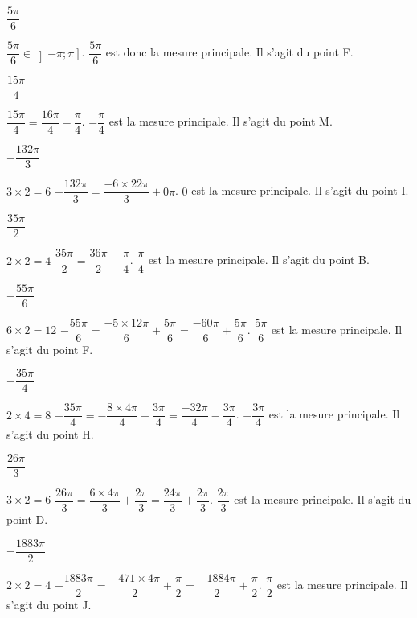 \documentclass[11pt,a4paper]{article}  %
\begin{document}
	\begin{enumMet}
		\item $\dfrac{5\pi}{6}$
		\begin{corrBox}
			$\dfrac{5 \pi}{6} \in\left]-\pi ; \pi\right]$. $\dfrac{5 \pi}{6}$ est donc la mesure principale. Il s'agit du point F.	
		\end{corrBox}
		\item $\dfrac{15\pi}{4}$
		\begin{corrBox}
			$\dfrac{15 \pi}{4}=\dfrac{16 \pi}{4}-\dfrac{\pi}{4}$. $-\dfrac{\pi}{4}$ est la mesure principale. Il s'agit du point M.
		\end{corrBox}
		\item $-\dfrac{132\pi}{3}$
		\begin{corrBox}
			$3 \times 2=6$ \quad \quad $-\dfrac{132\pi}{3}=\dfrac{-6 \times 22 \pi}{3}+0 \pi$. $0$ est la mesure principale. Il s'agit du point I.
		\end{corrBox}
		\item $\dfrac{35\pi}{2}$
		\begin{corrBox}
			$2 \times 2=4$ \quad \quad $\dfrac{35 \pi}{2}=\dfrac{36 \pi}{2}-\dfrac{\pi}{4}$. $\dfrac{\pi}{4}$ est la mesure principale. Il s'agit du point B.
		\end{corrBox}
		\item $-\dfrac{55\pi}{6}$
		\begin{corrBox}
			$6 \times 2=12$ \quad \quad $-\dfrac{55 \pi}{6}=\dfrac{-5 \times 12 \pi}{6}+\dfrac{5 \pi}{6}=\dfrac{-60 \pi}{6}+\dfrac{5 \pi}{6}$. $\dfrac{5 \pi}{6}$ est la mesure principale. Il s'agit du point F.
		\end{corrBox}
		\item $-\dfrac{35\pi}{4}$
		\begin{corrBox}
			$2 \times 4=8$ \quad \quad $-\dfrac{35 \pi}{4}=-\dfrac{8 \times 4 \pi}{4}-\dfrac{3 \pi}{4}=\dfrac{-32 \pi}{4}-\dfrac{3 \pi}{4}$. $-\dfrac{3 \pi}{4}$ est la mesure principale. Il s'agit du point H.
		\end{corrBox}
		\item $\dfrac{26\pi}{3}$
		\begin{corrBox}
			$3 \times 2=6$ \quad \quad $\dfrac{26 \pi}{3}=\dfrac{6 \times 4 \pi}{3}+\dfrac{2 \pi}{3}=\dfrac{24 \pi}{3}+\dfrac{2 \pi}{3}$. $\dfrac{2 \pi}{3}$ est la mesure principale. Il s'agit du point D.
		\end{corrBox}
		\item $-\dfrac{1883\pi}{2}$
		\begin{corrBox}
			$2 \times 2=4$ \quad \quad $-\dfrac{1883 \pi}{2}=\dfrac{-471 \times 4 \pi}{2}+\dfrac{\pi}{2}=\dfrac{-1884 \pi}{2}+\dfrac{\pi}{2}$. $\dfrac{\pi}{2}$ est la mesure principale. Il s'agit du point J.
		\end{corrBox}
	\end{enumMet}
\end{document}
